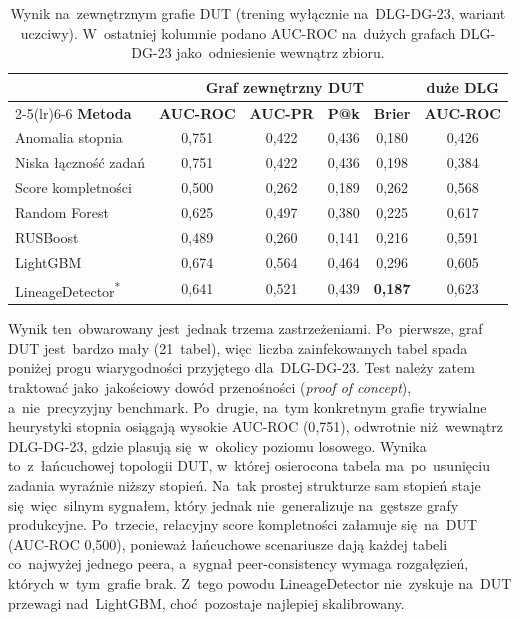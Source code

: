 \documentclass[polish,master,a4paper,oneside]{ppfcmthesis}
\renewcommand{\_}{\origtextunderscore\ifmmode\else\allowbreak\fi}
\begin{document}
\begin{table}[ht]
\centering
\caption[Wynik na~zewnętrznym grafie DUT]{Wynik na~zewnętrznym grafie DUT (trening wyłącznie na~DLG-DG-23,
wariant uczciwy). W~ostatniej kolumnie podano AUC-ROC na~dużych grafach
DLG-DG-23 jako~odniesienie wewnątrz zbioru.}
\label{tab:cross-dataset}
\begin{tabular}{lcccc c}
\toprule
& \multicolumn{4}{c}{\textbf{Graf zewnętrzny DUT}} & \textbf{duże DLG} \\
\cmidrule(lr){2-5}\cmidrule(lr){6-6}
\textbf{Metoda} & \textbf{AUC-ROC} & \textbf{AUC-PR} & \textbf{P@k} & \textbf{Brier} & \textbf{AUC-ROC} \\
\midrule
Anomalia stopnia      & 0{,}751 & 0{,}422 & 0{,}436 & 0{,}180 & 0{,}426 \\
Niska łączność zadań  & 0{,}751 & 0{,}422 & 0{,}436 & 0{,}198 & 0{,}384 \\
Score kompletności    & 0{,}500 & 0{,}262 & 0{,}189 & 0{,}262 & 0{,}568 \\
\midrule
Random Forest         & 0{,}625 & 0{,}497 & 0{,}380 & 0{,}225 & 0{,}617 \\
RUSBoost              & 0{,}489 & 0{,}260 & 0{,}141 & 0{,}216 & 0{,}591 \\
LightGBM              & 0{,}674 & 0{,}564 & 0{,}464 & 0{,}296 & 0{,}605 \\
LineageDetector\textsuperscript{*} & 0{,}641 & 0{,}521 & 0{,}439 & \textbf{0{,}187} & 0{,}623 \\
\bottomrule
\end{tabular}
\end{table}

Wynik ten~obwarowany jest~jednak trzema zastrzeżeniami. Po~pierwsze, graf DUT
jest~bardzo mały (21~tabel), więc~liczba zainfekowanych tabel spada poniżej
progu wiarygodności przyjętego dla~DLG-DG-23. Test należy zatem traktować
jako~jakościowy dowód przenośności (\emph{proof of concept}), a~nie~precyzyjny
benchmark. Po~drugie, na~tym konkretnym grafie trywialne heurystyki stopnia
osiągają wysokie AUC-ROC (0{,}751), odwrotnie niż~wewnątrz DLG-DG-23, gdzie
plasują się~w~okolicy poziomu losowego. Wynika to~z~łańcuchowej topologii DUT,
w~której osierocona tabela ma~po~usunięciu zadania wyraźnie niższy stopień.
Na~tak prostej strukturze sam stopień staje się~więc~silnym sygnałem, który
jednak nie~generalizuje na~gęstsze grafy produkcyjne. Po~trzecie, relacyjny
score kompletności załamuje się~na~DUT (AUC-ROC 0{,}500), ponieważ łańcuchowe
scenariusze dają każdej tabeli co~najwyżej jednego peera, a~sygnał
peer-consistency wymaga rozgałęzień, których w~tym~grafie brak. Z~tego
powodu LineageDetector nie~zyskuje na~DUT przewagi nad~LightGBM,
choć~pozostaje najlepiej skalibrowany.
\end{document}
